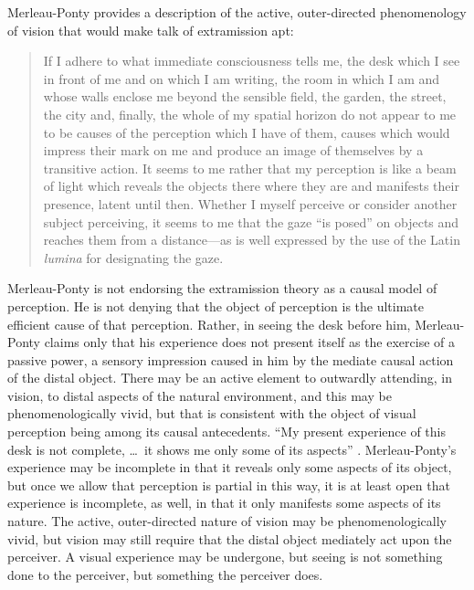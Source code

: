Merleau-Ponty provides a description of the active, outer-directed phenomenology of vision that would make talk of extramission apt:
\begin{quote}
	If I adhere to what immediate consciousness tells me, the desk which I see in front of me and on which I am writing, the room in which I am and whose walls enclose me beyond the sensible field, the garden, the street, the city and, finally, the whole of my spatial horizon do not appear to me to be causes of the perception which I have of them, causes which would impress their mark on me and produce an image of themselves by a transitive action. It seems to me rather that my perception is like a beam of light which reveals the objects there where they are and manifests their presence, latent until then. Whether I myself perceive or consider another subject perceiving, it seems to me that the gaze ``is posed'' on objects and reaches them from a distance---as is well expressed by the use of the Latin \emph{lumina} for designating the gaze. \citep[185]{Merleau-Ponty:1967fj}
\end{quote}
Merleau-Ponty is not endorsing the extramission theory as a causal model of perception. He is not denying that the object of perception is the ultimate efficient cause of that perception. Rather, in seeing the desk before him, Merleau-Ponty claims only that his experience does not present itself as the exercise of a passive power, a sensory impression caused in him by the mediate causal action of the distal object. There may be an active element to outwardly attending, in vision, to distal aspects of the natural environment, and this may be phenomenologically vivid, but that is consistent with the object of visual perception being among its causal antecedents. ``My present experience of this desk is not complete, \ldots\ it shows me only some of its aspects'' \citep[186]{Merleau-Ponty:1967fj}. Merleau-Ponty's experience may be incomplete in that it reveals only some aspects of its object, but once we allow that perception is partial in this way, it is at least open that experience is incomplete, as well, in that it only manifests some aspects of its nature. The active, outer-directed nature of vision may be phenomenologically vivid, but vision may still require that the distal object mediately act upon the perceiver. A visual experience may be undergone, but seeing is not something done to the perceiver, but something the perceiver does.

